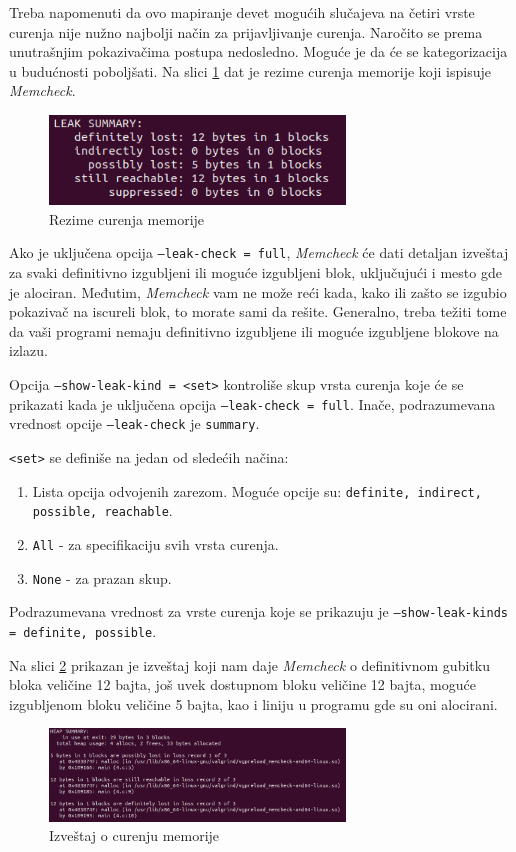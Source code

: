\documentclass[12pt,oneside]{memoir}
\theoremstyle{plain}
\theoremstyle{definition}
\begin{document}
Treba napomenuti da ovo mapiranje devet mogućih slučajeva na četiri vrste curenja nije nužno najbolji način za prijavljivanje curenja. Naročito se prema unutrašnjim pokazivačima postupa nedosledno. Moguće je da će se kategorizacija u budućnosti poboljšati. Na slici  \ref{fig:slika2.13} dat je rezime curenja memorije koji ispisuje \textit{Memcheck}.
\begin{figure}[!ht]
  \centering
  \includegraphics[width=0.7\textwidth]{leakResume.png}
  \caption{Rezime curenja memorije}
  \label{fig:slika2.13}
\end{figure}

Ako je uključena opcija \texttt{--leak-check = full}, \textit{Memcheck} će dati detaljan izveštaj za svaki definitivno izgubljeni ili moguće izgubljeni blok, uključujući i mesto gde je alociran. Međutim, \textit{Memcheck} vam ne može reći kada, kako ili zašto se izgubio pokazivač na iscureli blok, to morate sami da rešite. Generalno, treba težiti tome da vaši programi nemaju definitivno izgubljene ili moguće izgubljene blokove na izlazu.

Opcija \texttt{--show-leak-kind = <set>} kontroliše skup vrsta curenja koje će se prikazati kada je uključena opcija \texttt{--leak-check = full}. Inače, podrazumevana vrednost opcije \texttt{–leak-check} je \texttt{summary}.

\texttt{<set>} se definiše na jedan od sledećih načina:
\begin{enumerate}
\item Lista opcija odvojenih zarezom. Moguće opcije su: \texttt{definite, indirect, possible, reachable}.
\item \texttt{All} - za specifikaciju svih vrsta curenja.
\item \texttt{None} -  za prazan skup.
\end{enumerate}
Podrazumevana vrednost za vrste curenja koje se prikazuju je \texttt{--show-leak-kinds = definite, possible}.

Na slici \ref{fig:slika2.14} prikazan je izveštaj koji nam daje \textit{Memcheck} o definitivnom gubitku bloka veličine 12 bajta, još uvek dostupnom bloku veličine 12 bajta, moguće izgubljenom bloku veličine 5 bajta, kao i liniju u programu gde su oni alocirani. 
\begin{figure}[!ht]
  \centering
  \includegraphics[width=0.7\textwidth]{heapResume.png}
  \caption{Izveštaj o curenju memorije}
  \label{fig:slika2.14}
\end{figure}
\end{document}
